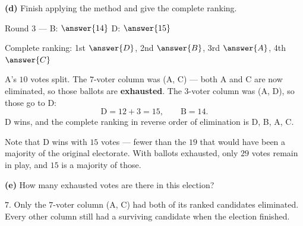 \documentclass[12pt]{ximera}
\begin{document}
\begin{problem}
\begin{prompt}
\textbf{(d)} Finish applying the method and give the complete ranking.

Round 3 --- B: $\answer{14}$ \quad D: $\answer{15}$

\smallskip
Complete ranking: 1st $\answer{D}$, 2nd $\answer{B}$, 3rd $\answer{A}$, 4th $\answer{C}$

\begin{feedback}
A's $10$ votes split. The $7$-voter column was (A, C) --- both A and C are now
eliminated, so those ballots are \textbf{exhausted}. The $3$-voter column was (A, D),
so those go to D:
\[ \text{D} = 12+3 = 15, \qquad \text{B} = 14. \]
D wins, and the complete ranking in reverse order of elimination is D, B, A, C.

Note that D wins with $15$ votes --- fewer than the $19$ that would have been a
majority of the original electorate. With ballots exhausted, only $29$ votes remain in
play, and $15$ is a majority of those.
\end{feedback}
\end{prompt}

\begin{prompt}
\textbf{(e)} How many exhausted votes are there in this election?

\begin{multipleChoice}
\end{multipleChoice}

\begin{feedback}
$7$. Only the $7$-voter column (A, C) had both of its ranked candidates eliminated.
Every other column still had a surviving candidate when the election finished.
\end{feedback}
\end{prompt}
\end{problem}
\end{document}
